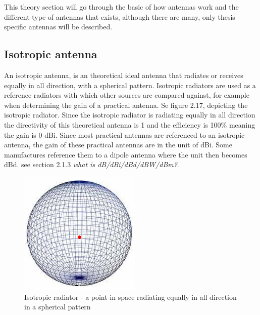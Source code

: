 This theory section will go through the basic of how antennas work and the different type of antennas that exists, although there are many, only thesis specific antennas will be described.

\subsection{Isotropic antenna}
An isotropic antenna, is an theoretical ideal antenna that radiates or receives equally in all direction, with a spherical pattern. Isotropic radiators are used as a reference radiators with which other sources are compared against, for example when determining the gain of a practical antenna. Se figure 2.17, depicting the isotropic radiator. Since the isotropic radiator is radiating equally in all direction the directivity of this theoretical antenna is 1 and the efficiency is 100\% meaning the gain is 0 dBi. Since most practical antennas are referenced to an isotropic antenna, the gain of these practical antennas are in the unit of dBi. Some manufactures reference them to a dipole antenna where the unit then becomes dBd. see section 2.1.3 \textit{what is dB/dBi/dBd/dBW/dBm?}.  

\begin{figure}[h]
\centering
\includegraphics[scale=1.3]{figures/Isotropic.png}
\caption{Isotropic radiator - a point in space radiating equally in all direction in a spherical pattern}
\end{figure}

